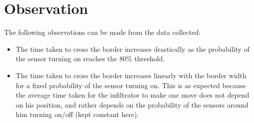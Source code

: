 \documentclass[12pt,a4paper]{article}
\begin{document}
\section{Observation}\label{sec:fObservation}
The following observations can be made from the data collected:
\begin{itemize}
	\item The time taken to cross the border increases drastically as the probability of the sensor turning on reaches the 80\% threshold.
	\item The time taken to cross the border increases linearly with the border width for a fixed probability of the sensor turning on. This is as expected because the average time taken for the infiltrator to make one move does not depend on his position, and rather depends on the probability of the sensors around him turning on/off (kept constant here).
\end{itemize}
\end{document}
